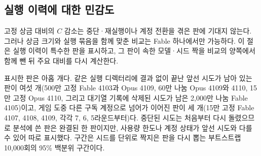 \subsection{실행 이력에 대한 민감도}\label{val:w6-history}

고정 상금 대비의 $C$ 감소는 중단·재실행이나 계정 전환을 겪은 판에 기대지 않는다. 그러나 상금 크기와 실행 묶음을 함께 맞춘 비교는 Fable 하나에서만 가능하다. 이 절은 실행 이력이 특수한 판을 표시하고, 그 판이 속한 모델·시드 짝을 비교의 양쪽에서 함께 뺀 뒤 주요 대비를 다시 계산한다.

표시한 판은 아홉 개다. 같은 실행 디렉터리에 결과 없이 끝난 앞선 시도가 남아 있는 판이 여섯 개(500만 고정 Fable 4103과 Opus 4109, 60만 나눔 Opus 4109와 4110, 15만 고정 Opus 4110, 그리고 대기열 기록에 삭제된 시도가 남은 2,000만 나눔 Fable 4105)이고, 게임 도중 다른 구독 계정으로 넘어가 이어진 판이 세 개(15만 고정 Fable 4107, 4108, 4109, 각각 7, 6, 5라운드부터)다. 중단된 시도는 처음부터 다시 돌렸으므로 분석에 쓴 판은 완결된 한 판이지만, 사용량 한도나 계정 상태가 앞선 시도와 다를 수 있어 따로 표시했다. 구간은 시드를 단위로 짝지은 판을 다시 뽑는 부트스트랩 10,000회의 95\% 백분위 구간이다.

